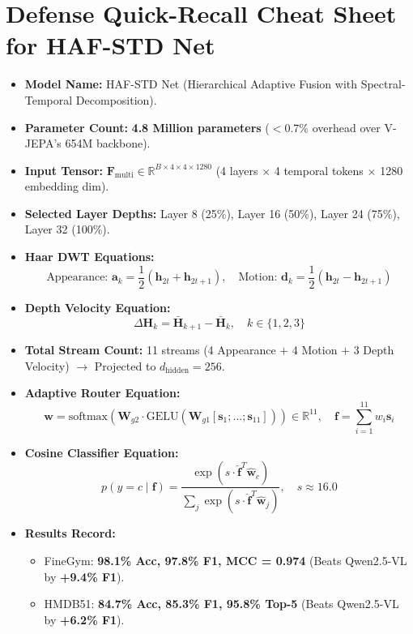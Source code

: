\documentclass[a4paper, 11pt]{article}
\begin{document}
\vspace{0.3cm}

\section{Defense Quick-Recall Cheat Sheet for HAF-STD Net}

\begin{cheatsheetbox}
\begin{itemize}
    \item \textbf{Model Name:} HAF-STD Net (Hierarchical Adaptive Fusion with Spectral-Temporal Decomposition).
    \item \textbf{Parameter Count:} \textbf{4.8 Million parameters} ($<0.7\%$ overhead over V-JEPA's 654M backbone).
    \item \textbf{Input Tensor:} $\mathbf{F}_{\text{multi}} \in \mathbb{R}^{B \times 4 \times 4 \times 1280}$ (4 layers $\times$ 4 temporal tokens $\times$ 1280 embedding dim).
    \item \textbf{Selected Layer Depths:} Layer 8 (25\%), Layer 16 (50\%), Layer 24 (75\%), Layer 32 (100\%).
    \item \textbf{Haar DWT Equations:}
    $$\text{Appearance: } \mathbf{a}_k = \frac{1}{2}(\mathbf{h}_{2t} + \mathbf{h}_{2t+1}), \quad \text{Motion: } \mathbf{d}_k = \frac{1}{2}(\mathbf{h}_{2t} - \mathbf{h}_{2t+1})$$
    \item \textbf{Depth Velocity Equation:}
    $$\Delta\mathbf{H}_k = \bar{\mathbf{H}}_{k+1} - \bar{\mathbf{H}}_k, \quad k \in \{1, 2, 3\}$$
    \item \textbf{Total Stream Count:} 11 streams (4 Appearance $+$ 4 Motion $+$ 3 Depth Velocity) $\rightarrow$ Projected to $d_{\text{hidden}} = 256$.
    \item \textbf{Adaptive Router Equation:}
    $$\mathbf{w} = \text{softmax}\left(\mathbf{W}_{g2} \cdot \text{GELU}(\mathbf{W}_{g1} [\mathbf{s}_1; \dots; \mathbf{s}_{11}])\right) \in \mathbb{R}^{11}, \quad \mathbf{f} = \sum_{i=1}^{11} w_i \mathbf{s}_i$$
    \item \textbf{Cosine Classifier Equation:}
    $$p(y=c \mid \mathbf{f}) = \frac{\exp(s \cdot \hat{\mathbf{f}}^T \hat{\mathbf{w}}_c)}{\sum_j \exp(s \cdot \hat{\mathbf{f}}^T \hat{\mathbf{w}}_j)}, \quad s \approx 16.0$$
    \item \textbf{Results Record:}
    \begin{itemize}
        \item FineGym: \textbf{98.1\% Acc, 97.8\% F1, MCC = 0.974} (Beats Qwen2.5-VL by \textbf{+9.4\% F1}).
        \item HMDB51: \textbf{84.7\% Acc, 85.3\% F1, 95.8\% Top-5} (Beats Qwen2.5-VL by \textbf{+6.2\% F1}).
    \end{itemize}
\end{itemize}
\end{cheatsheetbox}
\end{document}
